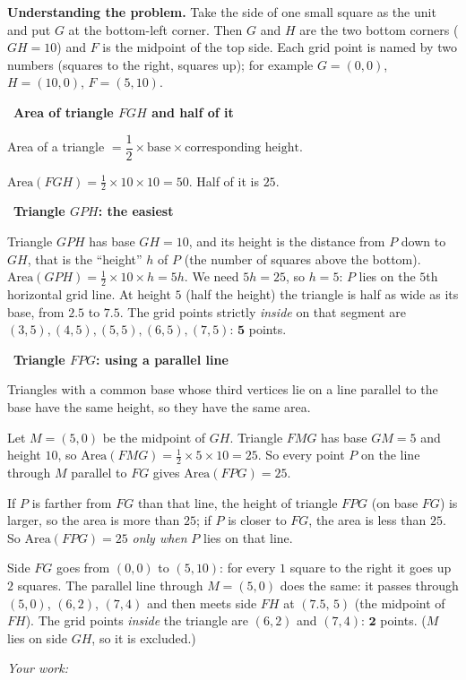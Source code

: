 \documentclass[11pt]{article}
\newif\ifsol \solfalse
\newcommand{\StuProb}[2]{\begin{probboxS}{#1}{#2}\StuProbBody\end{probboxS}}
\newcommand{\probsol}[1]{%
  \begin{lrbox}{\solmeasure}\begin{minipage}{\dimexpr\linewidth-24pt\relax}#1\end{minipage}\end{lrbox}%
  \ifsol
    \begin{solbox}#1\end{solbox}%
  \else
    \setlength{\solht}{\dimexpr\ht\solmeasure+\dp\solmeasure+0.85cm\relax}%
    \ifdim\solht<1.35cm\setlength{\solht}{1.35cm}\fi
    \ifdim\solht>\StudentMaxWork\setlength{\solht}{\StudentMaxWork}\fi
    \par\noindent\begin{minipage}{\linewidth}%
    \expandafter\StuProb\StuProbArgs
    \begin{tcolorbox}[colback=white,colframe=Line,boxrule=0.8pt,arc=5pt,
      left=8pt,right=8pt,top=4pt,bottom=4pt,height=\solht]{\footnotesize\color{Slate}\itshape\WorkWord}\end{tcolorbox}%
    \end{minipage}\par\medskip
  \fi}
\newlength{\StudentMaxWork}\setlength{\StudentMaxWork}{4.5cm}
\newcommand{\step}[2]{\par\smallskip\noindent{\bfseries\color{tmBlue!85!black}\StepWord~#1.}\ {\bfseries #2}\par\nopagebreak}
\def\WorkWord{Your work:}
\def\StepWord{Step}
\begin{document}
\probsol{
\textbf{Understanding the problem.} Take the side of one small square as the unit and put $G$ at the bottom-left corner. Then $G$ and $H$
are the two bottom corners ($GH=10$) and $F$ is the midpoint of the top side. Each grid point is named by two numbers (squares to the
right, squares up); for example $G=(0,0)$, $H=(10,0)$, $F=(5,10)$.

\step{1}{Area of triangle $FGH$ and half of it}
\begin{recallbox}Area of a triangle $=\dfrac12\times\text{base}\times\text{corresponding height}$.\end{recallbox}
$\text{Area}(FGH)=\frac12\times10\times10=50$. Half of it is $25$.

\step{2}{Triangle $GPH$: the easiest}
Triangle $GPH$ has base $GH=10$, and its height is the distance from $P$ down to $GH$, that is the ``height'' $h$ of $P$ (the number of
squares above the bottom). $\text{Area}(GPH)=\frac12\times10\times h=5h$. We need $5h=25$, so $h=5$: $P$ lies on the $5$th horizontal grid
line. At height $5$ (half the height) the triangle is half as wide as its base, from $2.5$ to $7.5$. The grid points strictly \emph{inside}
on that segment are $(3,5),(4,5),(5,5),(6,5),(7,5)$: $\mathbf{5}$ points.

\step{3}{Triangle $FPG$: using a parallel line}
\begin{recallbox}Triangles with a common base whose third vertices lie on a line parallel to the base have the same height, so they have the
same area.\end{recallbox}
Let $M=(5,0)$ be the midpoint of $GH$. Triangle $FMG$ has base $GM=5$ and height $10$, so $\text{Area}(FMG)=\frac12\times5\times10=25$.
So every point $P$ on the line through $M$ parallel to $FG$ gives $\text{Area}(FPG)=25$.
\begin{proofbox}If $P$ is farther from $FG$ than that line, the height of triangle $FPG$ (on base $FG$) is larger, so the area is more than
$25$; if $P$ is closer to $FG$, the area is less than $25$. So $\text{Area}(FPG)=25$ \emph{only when} $P$ lies on that line.\end{proofbox}
Side $FG$ goes from $(0,0)$ to $(5,10)$: for every $1$ square to the right it goes up $2$ squares. The parallel line through $M=(5,0)$ does the
same: it passes through $(5,0)$, $(6,2)$, $(7,4)$ and then meets side $FH$ at $(7.5,\,5)$ (the midpoint of $FH$). The grid points
\emph{inside} the triangle are $(6,2)$ and $(7,4)$: $\mathbf{2}$ points. ($M$ lies on side $GH$, so it is excluded.)

}
\end{document}
